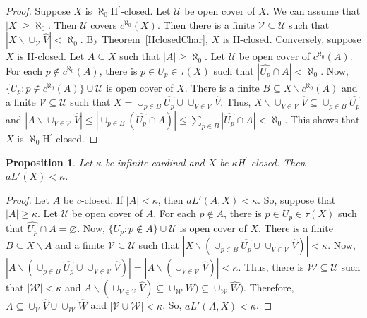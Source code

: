 \documentclass[11pt]{amsart}
\newif\ifdraft\draftfalse
\newtheorem{proposition}[theorem]{Proposition}
\theoremstyle{definition}
\theoremstyle{remark}
\numberwithin{equation}{section}
\begin{document}
\begin{proof}
Suppose $X$ is $\aleph_0$H$^{\prime}$-closed.  Let $\mathcal U$ be open cover of $X$.  We can assume that $|X| \geq \aleph_0$.  Then $\mathcal U$ covers $c^{\aleph_0}(X)$. Then there is a finite $\mathcal V \subseteq \mathcal U$ such that $|X\backslash \cup_{\mathcal V}\hat{V}| < \aleph_0$.  By Theorem~\ref{HclosedChar}, $X$ is H-closed.  Conversely, suppose $X$ is H-closed. Let $A \subseteq X$ such that $|A|\geq \aleph_0$.  Let $\mathcal U$ be open cover of $c^{\aleph_0}(A)$.  For each $p \not\in c^{\aleph_0}(A)$, there is $p \in U_p \in \tau(X)$ such that $|\hat{U_p} \cap A| < \aleph_0$.  Now, $\{U_p: p \not\in c^{\aleph_0}(A)\} \cup \mathcal U$ is open cover of $X$.  There is a finite $B \subseteq X\backslash c^{\aleph_0}(A)$ and a finite $\mathcal V \subseteq \mathcal U$ such that $X = \cup_{p \in B}\hat{U_p} \cup \cup_{V \in  \mathcal V}\hat{V}$.  Thus, $X \backslash \cup_{V \in  \mathcal V}\hat{V} \subseteq \cup_{p \in B}\hat{U_p}$ and $|A \backslash \cup_{V \in  \mathcal V}\hat{V} | \leq |\cup_{p \in B}(\hat{U_p}\cap A)| \leq \sum_{p\in B}|\hat{U_p}\cap A| < \aleph_0$.   This shows that $X$ is $\aleph_0$H$^{\prime}$-closed. 
\end{proof}

\begin{proposition}{{\immediate{}}{\ifdraft\hspace{-\lastskip}\vadjust{\vspace{-1mm}\smash{\llap{{\tt {{cardII}}}\hspace{8mm}}}\vspace{1mm}}\fi}} 
Let $\kappa$ be infinite cardinal and $X$ be  $\kappa$H$^{\prime}$-closed. Then $aL'(X) < \kappa$.
\end{proposition}

\begin{proof} Let $A$ be $c$-closed.  If $|A| < \kappa$, then $aL'(A,X) < \kappa.$  So, suppose that $|A| \geq \kappa$.  Let $\mathcal U$ be open cover of $A$. For each $p \not\in A$, there is $p \in U_p \in \tau(X)$ such that $\hat{U_p} \cap A = \varnothing$.  Now, $\{U_p: p \not\in A\} \cup \mathcal U$ is open cover of $X$.  There is a finite $B \subseteq X\backslash A$ and a finite $\mathcal V \subseteq \mathcal U$ such that $|X\backslash(\cup_{p \in B}\hat{U_p} \cup \cup_{V \in  \mathcal V}\hat{V})| < \kappa$.  Now, $|A\backslash(\cup_{p \in B}\hat{U_p} \cup \cup_{V \in  \mathcal V}\hat{V})| = |A\backslash( \cup_{V \in  \mathcal V}\hat{V})|  < \kappa$.  Thus, there is $\mathcal W \subseteq \mathcal U$ such that $|\mathcal W| < \kappa$ and $A\backslash(\cup_{V \in  \mathcal V}\hat{V}) \subseteq  \cup_{\mathcal W}W)   \subseteq  \cup_{\mathcal W}\hat{W}) $.  Therefore, $A \subseteq \cup_{\mathcal V}\hat{V} \cup\cup_{\mathcal W}\hat{W}$ and $|\mathcal V \cup \mathcal W| < \kappa$.  So, 
$aL'(A,X) < \kappa$. 
\end{proof} 
\end{document}
